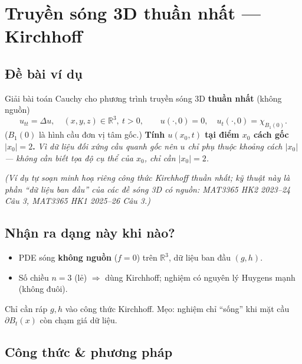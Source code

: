 
\section{Truyền sóng 3D thuần nhất --- Kirchhoff}

\subsection*{Đề bài ví dụ}
Giải bài toán Cauchy cho phương trình truyền sóng 3D \textbf{thuần nhất} (không nguồn)
\[
  u_{tt}=\Delta u,\quad (x,y,z)\in\mathbb{R}^3,\ t>0,\qquad
  u(\cdot,0)=0,\quad u_t(\cdot,0)=\chi_{B_1(0)}.
\]
($B_1(0)$ là hình cầu đơn vị tâm gốc.) \textbf{Tính $u(x_0,t)$ tại điểm $x_0$ cách gốc $|x_0|=2$.}
\emph{Vì dữ liệu đối xứng cầu quanh gốc nên $u$ chỉ phụ thuộc khoảng cách $|x_0|$ --- không cần biết tọa độ cụ thể của $x_0$, chỉ cần $|x_0|=2$.}

\emph{\small(Ví dụ tự soạn minh hoạ riêng công thức Kirchhoff thuần nhất; kỹ thuật này là phần ``dữ liệu ban đầu'' của các đề sóng 3D có nguồn: MAT3365 HK2 2023--24 Câu 3, MAT3365 HK1 2025--26 Câu 3.)}

\subsection*{Nhận ra dạng này khi nào?}
\begin{itemize}
  \item PDE sóng \textbf{không nguồn} ($f=0$) trên $\mathbb{R}^3$, dữ liệu ban đầu $(g,h)$.
  \item Số chiều $n=3$ (lẻ) $\Rightarrow$ dùng Kirchhoff; nghiệm có nguyên lý Huygens mạnh (không đuôi).
\end{itemize}
\begin{meobox}
Chỉ cần ráp $g,h$ vào công thức Kirchhoff. Mẹo: nghiệm chỉ ``sống'' khi mặt cầu $\partial B_t(x)$ còn chạm giá dữ liệu.
\end{meobox}

\subsection*{Công thức \& phương pháp}
